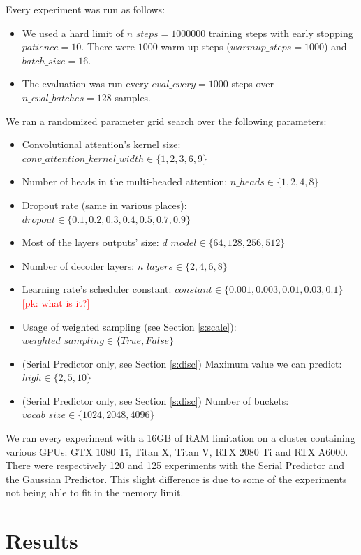 \documentclass[en]{pracamgr}
\newcommand{\pk}[1]{\textcolor{red}{\small [pk: #1]}}
\begin{document}
	
	Every experiment was run as follows:
	\begin{itemize}
		\item We used a hard limit of $n\_steps = 1000000$ training steps with early stopping $patience = 10$. There were $1000$ warm-up steps  ($warmup\_steps = 1000$) and $batch\_size = 16$.
		\item The evaluation was run every $eval\_every = 1000$ steps over $n\_eval\_batches = 128$ samples.
	\end{itemize}
	We ran a randomized parameter grid search over the following parameters:
	\begin{itemize}
		\item Convolutional attention's kernel size: $conv\_attention\_kernel\_width \in \{ 1, 2, 3, 6, 9 \}$
		\item Number of heads in the multi-headed attention: $ n\_heads \in \{ 1, 2, 4, 8 \} $
		\item Dropout rate (same in various places): $dropout \in \{ 0.1, 0.2, 0.3, 0.4, 0.5, 0.7, 0.9 \} $
		\item Most of the layers outputs' size: $d\_model \in \{ 64, 128, 256, 512 \} $
		\item Number of decoder layers: $n\_layers \in \{ 2, 4, 6, 8 \}$
		\item Learning rate's scheduler constant: $constant \in \{ 0.001, 0.003, 0.01, 0.03, 0.1 \}$ \pk{what is it?}
		\item Usage of weighted sampling (see Section \ref{s:scale}): $weighted\_sampling \in \{ True, False \}$
		\item (Serial Predictor only, see Section \ref{s:disc}) Maximum value we can predict: $high \in \{2, 5, 10\}$ 
		\item (Serial Predictor only, see Section \ref{s:disc}) Number of buckets: $vocab\_size \in \{1024, 2048, 4096\}$ 
	\end{itemize}
	
	We ran every experiment with a 16GB of RAM limitation on a cluster containing various GPUs: GTX 1080 Ti, Titan X, Titan V, RTX 2080 Ti and RTX A6000.
	There were respectively 120 and 125 experiments with the Serial Predictor and the Gaussian Predictor. This slight difference is due to some of the experiments not being able to fit in the memory limit.
	
	
	\section{Results}
	
\end{document}
